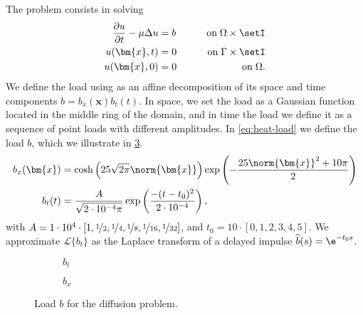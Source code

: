 \pagebreak
The problem consists in solving
\begin{alignat}{2}
    \frac{\partial{u}}{\partial{t}} - \mu \Delta u &= b &\qquad \text{on} \; \Omega \times \setI \\
    u(\bm{x},t) &= 0 &\qquad \text{on} \; \Gamma \times \setI \\
    u(\bm{x},0) &= 0 &\qquad \text{on} \; \Omega. \label{eq:ht1}
\end{alignat}
We define the load using as an affine decomposition of its space and time components $b = b_x(\bm{x}) b_t(t)$. In space, we set the load as a Gaussian function located in the middle ring of the domain, and in time the load we define it as a sequence of point loads with different amplitudes. In \cref{eq:heat-load} we define the load $b$, which we illustrate in \cref{fig:dif-load}.
\begin{align}
    b_x(\bm{x}) &= \cosh \left( 25 \sqrt{2 \pi} \norm{\bm{x}} \right) \exp \left( - \frac{25 \norm{\bm{x}}^2 + 10 \pi}{2} \right)\\
    b_t(t) &= \frac{A}{\sqrt{2\cdot 10^{-4}\pi}} \exp \left( {\frac{-(t-t_0)^2}{2\cdot 10^{-4}}} \right), \label{eq:heat-load}
\end{align}
with $A = 1\cdot10^4 \cdot [1,\nicefrac{1}{2},\nicefrac{1}{4},\nicefrac{1}{8},\nicefrac{1}{16},\nicefrac{1}{32}]$, and $ t_0 = 10\cdot[0,1,2,3,4,5]$. We approximate $\mathcal{L} \{b_t\}$ as the Laplace transform of a delayed impulse $\widehat{b}(s) = \e^{-t_0s}$.

\hspace{-2mm}
\begin{figure}[H]
	\centering
	\begin{subfigure}[htb!]{0.55\textwidth}
        \centering
        
        \caption{$b_t$} 
        \label{fig:dif-load1}
    \end{subfigure}
    \begin{subfigure}[htb!]{0.4\textwidth}
        \centering
        
        \caption{$b_x$} 
	   \label{fig:dif-load2}
    \end{subfigure}
	\caption{Load $b$ for the diffusion problem.} 
    \label{fig:dif-load}
\end{figure}

